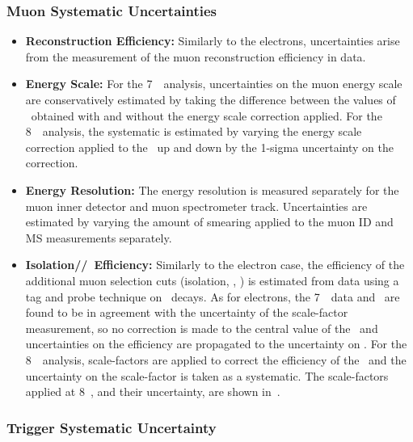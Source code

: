 \subsubsection{Muon Systematic Uncertainties}

\begin{itemize}
     \item {\bf Reconstruction Efficiency:}
     Similarly to the electrons, uncertainties arise from the measurement of the
     muon reconstruction efficiency in data.

    \item {\bf Energy Scale:} For the 7~\tev\ analysis, uncertainties on the muon energy scale are
    conservatively estimated by taking the difference between the values of \CZZ\
    obtained with and without the energy scale correction applied. For the
    8~\tev\ analysis, the systematic is estimated by varying the energy scale
    correction applied to the \mc\ up and down by the 1-sigma uncertainty on the
    correction.

    \item {\bf Energy Resolution:} The energy resolution is measured separately
    for the muon inner detector and muon spectrometer track. Uncertainties are
    estimated by varying the amount of smearing applied to the muon ID and MS
    measurements separately. 
    
    \item {\bf Isolation/\zzero/\dzero\ Efficiency:} Similarly to the electron case,
    the efficiency of the additional muon selection cuts (isolation, \zzero,
    \dzerosig) is estimated from data using a tag and probe technique on \Zmm\
    decays. As for electrons, the 7~\tev\ data and \mc\ are found to be in 
    agreement with the uncertainty of the scale-factor measurement, so no correction is made to the central value of the \mc\ and
    uncertainties on the efficiency are propagated to the uncertainty on \CZZ. For the 8~\tev\
    analysis, scale-factors are applied to correct the efficiency of the \mc\, and the uncertainty on the
    scale-factor is taken as a systematic. The scale-factors applied at 8~\tev,
    and their uncertainty, are shown in~\fig{iso-ip-sf-eight}.

\end{itemize}

\subsubsection{Trigger Systematic Uncertainty}

